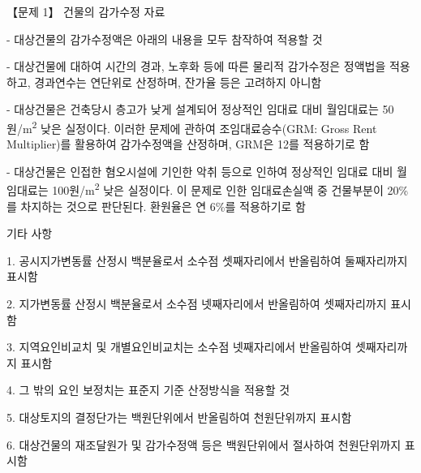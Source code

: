 \begin{longquestion}{【문제 1】}
\medskip{} 건물의 감가수정 자료 \par
- 대상건물의 감가수정액은 아래의 내용을 모두 참작하여 적용할 것 \par
- 대상건물에 대하여 시간의 경과, 노후화 등에 따른 물리적 감가수정은 정액법을 적용하고, 경과연수는 연단위로 산정하며, 잔가율 등은 고려하지 아니함 \par
- 대상건물은 건축당시 층고가 낮게 설계되어 정상적인 임대료 대비 월임대료는 50원/m\textsuperscript{2} 낮은 실정이다. 이러한 문제에 관하여 조임대료승수(GRM: Gross Rent Multiplier)를 활용하여 감가수정액을 산정하며, GRM은 12를 적용하기로 함 \par
- 대상건물은 인접한 혐오시설에 기인한 악취 등으로 인하여 정상적인 임대료 대비 월임대료는 100원/m\textsuperscript{2} 낮은 실정이다. 이 문제로 인한 임대료손실액 중 건물부분이 20\%를 차지하는 것으로 판단된다. 환원율은 연 6\%를 적용하기로 함 \par
\medskip{} 기타 사항 \par
1. 공시지가변동률 산정시 백분율로서 소수점 셋째자리에서 반올림하여 둘째자리까지 표시함 \par
2. 지가변동률 산정시 백분율로서 소수점 넷째자리에서 반올림하여 셋째자리까지 표시함 \par
3. 지역요인비교치 및 개별요인비교치는 소수점 넷째자리에서 반올림하여 셋째자리까지 표시함 \par
4. 그 밖의 요인 보정치는 표준지 기준 산정방식을 적용할 것 \par
5. 대상토지의 결정단가는 백원단위에서 반올림하여 천원단위까지 표시함 \par
6. 대상건물의 재조달원가 및 감가수정액 등은 백원단위에서 절사하여 천원단위까지 표시함 \par
\end{longquestion}
